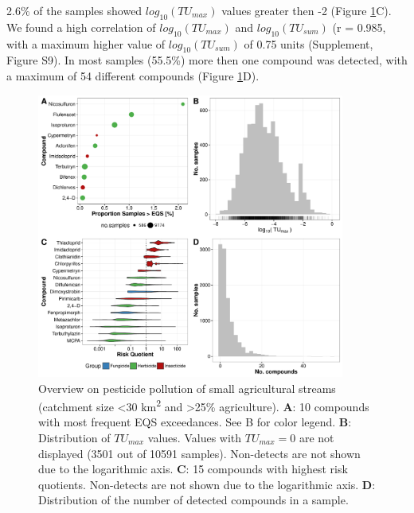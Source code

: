 \documentclass[journal=esthag,manuscript=article]{achemso}
\begin{document}
2.6\% of the samples showed $log_{10}(TU_{max})$ values greater then -2 (Figure \ref{fig:fig5}C).
%
%
We found a high correlation of $log_{10}(TU_{max})$ and $log_{10}(TU_{sum})$ (r = 0.985, with a maximum higher value of $log_{10}(TU_{sum})$ of 0.75 units (Supplement, Figure S9).
%
%
In most samples (55.5\%) more then one compound was detected, with a maximum of 54 different compounds (Figure \ref{fig:fig5}D). 


\begin{figure}[h]
  \includegraphics[width=0.9\textwidth]{figure5.pdf}
  \caption{Overview on pesticide pollution of small agricultural streams (catchment size \textless 30 km\textsuperscript{2} and \textgreater 25\% agriculture). 
      \textbf{A}: 10 compounds with most frequent EQS exceedances. See B for color legend.
      \textbf{B}: Distribution of $TU_{max}$ values. Values with $TU_{max} = 0$ are not displayed (3501 out of 10591 samples). Non-detects are not shown due to the logarithmic axis.
      \textbf{C}: 15 compounds with highest risk quotients. Non-detects are not shown due to the logarithmic axis.
      \textbf{D}: Distribution of the number of detected compounds in a sample.
  }
  \label{fig:fig5}
\end{figure}
\end{document}
